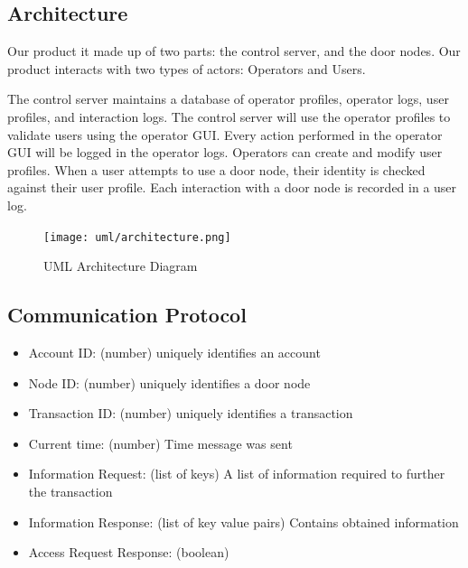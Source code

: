 \subsection{Architecture}

Our product it made up of two parts: the control server, and the door nodes.
Our product interacts with two types of actors: Operators and Users.

The control server maintains a database of operator profiles, operator logs,
user profiles, and interaction logs.  The control server will use the operator
profiles to validate users using the operator GUI.  Every action performed in
the operator GUI will be logged in the operator logs.  Operators can create and
modify user profiles.  When a user attempts to use a door node, their identity
is checked against their user profile.  Each interaction with a door node is
recorded in a user log.

\begin{figure}[!htb]
\centering
\texttt{[image: uml/architecture.png]}
\caption{UML Architecture Diagram}
\label{fig:architecture-diagram}
\end{figure}

\subsection{Communication Protocol}

\begin{itemize}
\item Account ID: (number) uniquely identifies an account
\item Node ID: (number) uniquely identifies a door node
\item Transaction ID: (number) uniquely identifies a transaction
\item Current time: (number) Time message was sent
\item Information Request: (list of keys) A list of information required to further the
transaction
\item Information Response: (list of key value pairs) Contains obtained information
\item Access Request Response: (boolean)
\end{itemize}

